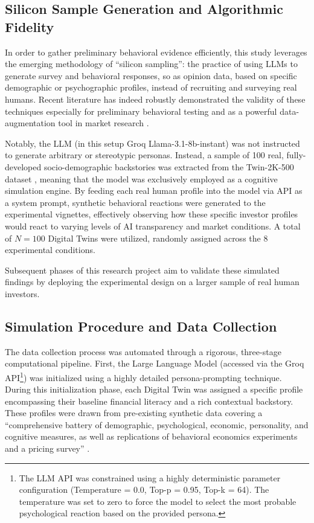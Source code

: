 \documentclass[10pt, a4paper]{article} %
\begin{document}
\subsection{Silicon Sample Generation and Algorithmic Fidelity}

In order to gather preliminary behavioral evidence efficiently, this study leverages the emerging methodology of ``silicon sampling'': the practice of using LLMs to generate survey and behavioral responses, so as opinion data, based on specific demographic or psychographic profiles, instead of recruiting and surveying real humans. Recent literature has indeed robustly demonstrated the validity of these techniques especially for preliminary behavioral testing \citep{sarstedt2024using} and as a powerful data-augmentation tool in market research \citep{wang2026large}.

Notably, the LLM (in this setup Groq Llama-3.1-8b-instant) was not instructed to generate arbitrary or stereotypic personas. Instead, a sample of 100 real, fully-developed socio-demographic backstories was extracted from the Twin-2K-500 dataset \citep{toubia2025database}, meaning that the model was exclusively employed as a cognitive simulation engine. By feeding each real human profile into the model via API as a system prompt, synthetic behavioral reactions were generated to the experimental vignettes, effectively observing how these specific investor profiles would react to varying levels of AI transparency and market conditions.
A total of $N=100$ Digital Twins were utilized, randomly assigned across the 8 experimental conditions.

Subsequent phases of this research project aim to validate these simulated findings by deploying the experimental design on a larger sample of real human investors.

\subsection{Simulation Procedure and Data Collection}

The data collection process was automated through a rigorous, three-stage computational pipeline. First, the Large Language Model (accessed via the Groq API\footnote{The LLM API was constrained using a highly deterministic parameter configuration (Temperature = 0.0, Top-p = 0.95, Top-k = 64). The temperature was set to zero to force the model to select the most probable psychological reaction based on the provided persona.}) was initialized using a highly detailed persona-prompting technique. During this initialization phase, each Digital Twin was assigned a specific profile encompassing their baseline financial literacy and a rich contextual backstory. These profiles were drawn from pre-existing synthetic data covering a ``comprehensive battery of demographic, psychological, economic, personality, and cognitive measures, as well as replications of behavioral economics experiments and a pricing survey'' \citep{toubia2025database}.
\end{document}
